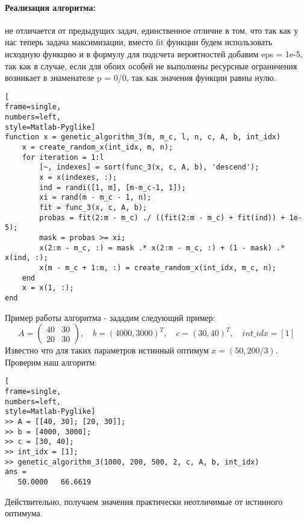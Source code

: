 \documentclass[12pt]{article}
\begin{document}
\paragraph{Реализация алгоритма:} не отличается от предыдущих задач, единственное отличие в том, что так как у нас теперь задача максимизации, вместо fit функции будем использовать исходную функцию и в формулу для подсчета вероятностей добавим eps = 1e-5, так как в случае, если для обоих особей не выполнены ресурсные ограничения возникает в знаменателе p = 0/0, так как значения функции равны нулю. 
\begin{lstlisting}[
frame=single,
numbers=left,
style=Matlab-Pyglike]
function x = genetic_algorithm_3(m, m_c, l, n, c, A, b, int_idx)
    x = create_random_x(int_idx, m, n);
    for iteration = 1:l
        [~, indexes] = sort(func_3(x, c, A, b), 'descend');
        x = x(indexes, :);
        ind = randi([1, m], [m-m_c-1, 1]);
        xi = rand(m - m_c - 1, n);
        fit = func_3(x, c, A, b);
        probas = fit(2:m - m_c) ./ ((fit(2:m - m_c) + fit(ind)) + 1e-5);
        mask = probas >= xi;
        x(2:m - m_c, :) = mask .* x(2:m - m_c, :) + (1 - mask) .* x(ind, :);
        x(m - m_c + 1:m, :) = create_random_x(int_idx, m_c, n);
    end
    x = x(1, :);
end
\end{lstlisting}
Пример работы алгоритма - зададим следующий пример:
$$
A = \begin{pmatrix}
	40 & 30 \\
	20 & 30
\end{pmatrix}, \quad b = (4000 , 3000)^T, \quad c = (30, 40)^T, \quad int\_idx = [1]
$$
Известно что для таких параметров истинный оптимум $x = (50, 200/3)$. 
Проверим наш алгоритм:
\begin{lstlisting}[
frame=single,
numbers=left,
style=Matlab-Pyglike]
>> A = [[40, 30]; [20, 30]];
>> b = [4000, 3000];
>> c = [30, 40];
>> int_idx = [1];
>> genetic_algorithm_3(1000, 200, 500, 2, c, A, b, int_idx)
ans =
   50.0000   66.6619
\end{lstlisting}
Действительно, получаем значения практически неотличимые от истинного оптимума.
\end{document}

